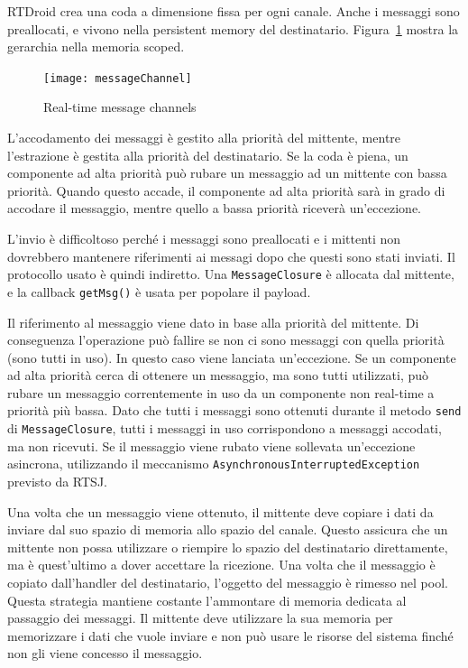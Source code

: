 RTDroid crea una coda a dimensione fissa per ogni canale. Anche i messaggi sono preallocati, e vivono nella persistent memory del destinatario. Figura~\ref{fig:messagechannel} mostra la gerarchia nella memoria scoped.
\begin{figure}[h]
	\centering
	\texttt{[image: messageChannel]}
	\caption{Real-time message channels}
	\label{fig:messagechannel}
\end{figure}

L'accodamento dei messaggi è gestito alla priorità del mittente, mentre l'estrazione è gestita alla priorità del destinatario. Se la coda è piena, un componente ad alta priorità può rubare un messaggio ad un mittente con bassa priorità. Quando questo accade, il componente ad alta priorità sarà in grado di accodare il messaggio, mentre quello a bassa priorità riceverà un'eccezione.

L'invio è difficoltoso perché i messaggi sono preallocati e i mittenti non dovrebbero mantenere riferimenti ai messagi dopo che questi sono stati inviati. Il protocollo usato è quindi indiretto. Una \texttt{MessageClosure} è allocata dal mittente, e la callback \texttt{getMsg()} è usata per popolare il payload.

Il riferimento al messaggio viene dato in base alla priorità del mittente. Di conseguenza l'operazione può fallire se non ci sono messaggi con quella priorità (sono tutti in uso). In questo caso viene lanciata un'eccezione. Se un componente ad alta priorità cerca di ottenere un messaggio, ma sono tutti utilizzati, può rubare un messaggio correntemente in uso da un componente non real-time a priorità più bassa. Dato che tutti i messaggi sono ottenuti durante il metodo \texttt{send} di \texttt{MessageClosure}, tutti i messaggi in uso corrispondono a messaggi accodati, ma non ricevuti. Se il messaggio viene rubato viene sollevata un'eccezione asincrona, utilizzando il meccanismo \texttt{AsynchronousInterruptedException} previsto da RTSJ.

Una volta che un messaggio viene ottenuto, il mittente deve copiare i dati da inviare dal suo spazio di memoria allo spazio del canale. Questo assicura che un mittente non possa utilizzare o riempire lo spazio del destinatario direttamente, ma è quest'ultimo a dover accettare la ricezione. Una volta che il messaggio è copiato dall'handler del destinatario, l'oggetto del messaggio è rimesso nel pool. Questa strategia mantiene costante l'ammontare di memoria dedicata al passaggio dei messaggi. Il mittente deve utilizzare la sua memoria per memorizzare i dati che vuole inviare e non può usare le risorse del sistema finché non gli viene concesso il messaggio.

